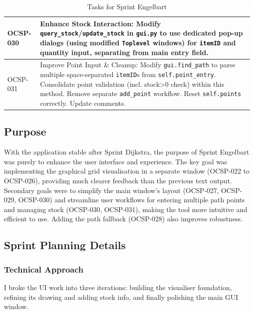 \begin{table}[htbp]
\begin{tabularx}{\textwidth}{|l|X|}
		\hline
		OCSP-030 & Enhance Stock Interaction: Modify \verb|query_stock|/\verb|update_stock| in \verb|gui.py| to use dedicated pop-up dialogs (using modified \verb|Toplevel| windows) for \verb|itemID| and quantity input, separating from main entry field. \\
		\hline
		OCSP-031 & Improve Point Input \& Cleanup: Modify \verb|gui.find_path| to parse multiple space-separated \verb|itemID|s from \verb|self.point_entry|. Consolidate point validation (incl. stock>0 check) within this method. Remove separate \verb|add_point| workflow. Reset \verb|self.points| correctly. Update comments. \\
		\hline
	\end{tabularx}
	\caption{Tasks for Sprint Engelbart}
\end{table}

\subsection{Purpose}
With the application stable after Sprint Dijkstra, the purpose of Sprint Engelbart was purely to enhance the user interface and experience. The key goal was implementing the graphical grid visualisation in a separate window (OCSP-022 to OCSP-026), providing much clearer feedback than the previous text output. Secondary goals were to simplify the main window's layout (OCSP-027, OCSP-029, OCSP-030) and streamline user workflows for entering multiple path points and managing stock (OCSP-030, OCSP-031), making the tool more intuitive and efficient to use. Adding the path fallback (OCSP-028) also improves robustness.

\clearpage
\subsection{Sprint Planning Details}

\subsubsection{Technical Approach}
I broke the UI work into three iterations: building the visualiser foundation, refining its drawing and adding stock info, and finally polishing the main GUI window.

